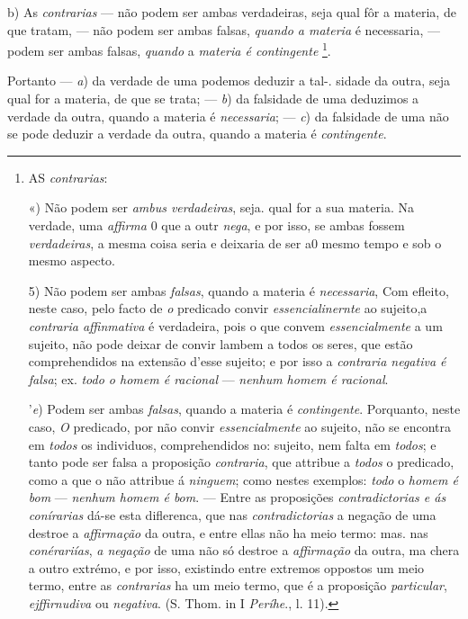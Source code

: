 b) As \emph{contrarias} --- não podem ser ambas verdadeiras, seja qual fôr a materia, de que tratam, --- não podem ser ambas falsas, \emph{quando a materia} é necessaria, --- podem ser ambas falsas, \emph{quando} a \emph{materia é contingente} \footnote{AS \emph{contrarias}:\par «) Não podem ser \emph{ambus verdadeiras}, seja. qual for a sua materia. Na verdade, uma \emph{affirma} 0 que a outr \emph{nega}, e por isso, se ambas fossem \emph{verdadeiras}, a mesma coisa seria e deixaria de ser a0 mesmo tempo e sob o mesmo aspecto.\par 5) Não podem ser ambas \emph{falsas}, quando a materia é \emph{necessaria}, Com efleito, neste caso, pelo facto de \emph{o} predicado convir \emph{essencialinernte} ao sujeito,a \emph{contraria affinmativa} é verdadeira, pois o que convem \emph{essencialmente} a um sujeito, não pode deixar de convir lambem a todos os seres, que estão comprehendidos na extensão d'esse sujeito; e por isso a \emph{contraria negativa é falsa}; ex. \emph{todo o homem é racional} --- \emph{nenhum homem é racional}.\par '\emph{e}) Podem ser ambas \emph{falsas}, quando a materia é \emph{contingente}. Porquanto, neste caso, \emph{O} predicado, por não convir \emph{essencialmente} ao sujeito, não se encontra em \emph{todos} os individuos, comprehendidos no: sujeito, nem falta em \emph{todos}; e tanto pode ser falsa a proposição \emph{contraria}, que attribue a \emph{todos} o predicado, como a que o não attribue á \emph{ninguem}; como nestes exemplos: \emph{todo} o \emph{homem é bom} --- \emph{nenhum homem é bom}. --- Entre as proposições \emph{contradictorias e ás conírarias} dá-se esta diflerenca, que nas \emph{contradictorias} a negação de uma destroe a \emph{affirmação} da outra, e entre ellas não ha meio termo: mas. nas \emph{conérariías}, \emph{a negação} de uma não só destroe a \emph{affirmação} da outra, ma chera a outro extrémo, e por isso, existindo entre extremos oppostos um meio termo, entre as \emph{contrarias} ha um meio termo, que é a proposição \emph{particular}, \emph{ejffirnudiva} ou \emph{negativa}. (S. Thom. in I \emph{Períhe}., l. 11).}.

Portanto --- \emph{a}) da verdade de uma podemos deduzir a tal-. sidade da outra, seja qual for a materia, de que se trata; --- \emph{b}) da falsidade de uma deduzimos a verdade da outra, quando a materia é \emph{necessaria}; --- \emph{c}) da falsidade de uma não se pode deduzir a verdade da outra, quando a materia é \emph{contingente}.

